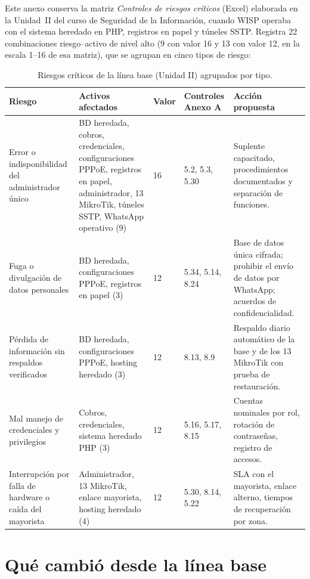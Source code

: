 Este anexo conserva la matriz \emph{Controles de riesgos críticos} (Excel) elaborada en la
Unidad~II del curso de Seguridad de la Información, cuando WISP operaba con el sistema
heredado en PHP, registros en papel y túneles SSTP. Registra 22 combinaciones riesgo--activo
de nivel alto (9 con valor 16 y 13 con valor 12, en la escala 1--16 de esa matriz), que se
agrupan en cinco tipos de riesgo:

\begin{table}[htbp]
\centering
\caption{Riesgos críticos de la línea base (Unidad II) agrupados por tipo.}
\label{tab:anx-lineabase}
\small
\begin{tabularx}{\textwidth}{L{3.2cm}L{3.4cm}C{0.8cm}L{2.8cm}X}
\toprule
\textbf{Riesgo} & \textbf{Activos afectados} & \textbf{Valor} & \textbf{Controles Anexo A} & \textbf{Acción propuesta} \\
\midrule
Error o indisponibilidad del administrador único & BD heredada, cobros, credenciales, configuraciones PPPoE, registros en papel, administrador, 13 MikroTik, túneles SSTP, WhatsApp operativo (9) & 16 & 5.2, 5.3, 5.30 & Suplente capacitado, procedimientos documentados y separación de funciones. \\
Fuga o divulgación de datos personales & BD heredada, configuraciones PPPoE, registros en papel (3) & 12 & 5.34, 5.14, 8.24 & Base de datos única cifrada; prohibir el envío de datos por WhatsApp; acuerdos de confidencialidad. \\
Pérdida de información sin respaldos verificados & BD heredada, configuraciones PPPoE, hosting heredado (3) & 12 & 8.13, 8.9 & Respaldo diario automático de la base y de los 13 MikroTik con prueba de restauración. \\
Mal manejo de credenciales y privilegios & Cobros, credenciales, sistema heredado PHP (3) & 12 & 5.16, 5.17, 8.15 & Cuentas nominales por rol, rotación de contraseñas, registro de accesos. \\
Interrupción por falla de hardware o caída del mayorista & Administrador, 13 MikroTik, enlace mayorista, hosting heredado (4) & 12 & 5.30, 8.14, 5.22 & SLA con el mayorista, enlace alterno, tiempos de recuperación por zona. \\
\bottomrule
\end{tabularx}
\end{table}

\section{Qué cambió desde la línea base}

